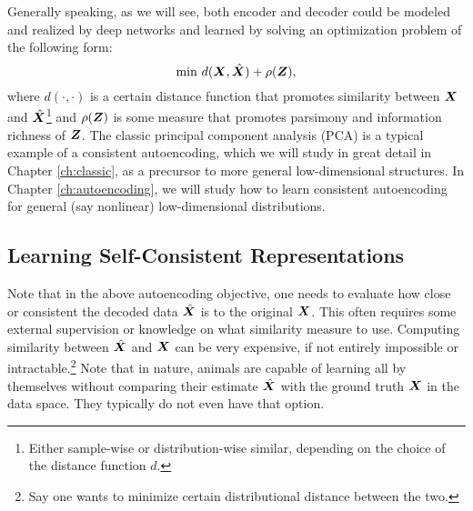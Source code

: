\documentclass[../../book-main.tex]{subfiles}
\begin{document}
Generally speaking, as we will see, both encoder and decoder could be modeled and realized by deep networks and learned by solving an optimization problem of the following form:
\begin{equation}
   \min \, d( \bm{X}, \hat {\bm{X}}) + \rho(\bm{Z}), 
   \label{eqn:auto-encoding-objective}
\end{equation}
where $d(\cdot, \cdot)$ is a certain distance function that promotes similarity between $\bm{X}$ and $\hat {\bm{X}}$\footnote{Either sample-wise or distribution-wise similar, depending on the choice of the distance function $d$.} and $\rho(\bm{Z})$ is some measure that promotes parsimony and information richness of $\bm{Z}$. The classic principal component analysis (PCA) \cite{JolliffeI2002} is a typical example of a consistent autoencoding, which we will study in great detail in Chapter \ref{ch:classic}, as a precursor to more general low-dimensional structures. In Chapter \ref{ch:autoencoding}, we will study how to learn consistent autoencoding for general (say nonlinear) low-dimensional distributions.  


\subsection{Learning Self-Consistent Representations}
Note that in the above autoencoding objective, one needs to evaluate how close or consistent the decoded data $\hat {\bm{X}}$ is to the original $\bm{X}$. This often requires some external supervision or knowledge on what similarity measure to use. Computing similarity between $\hat {\bm{X}}$ and $\bm{X}$ can be very expensive, if not entirely impossible or intractable.\footnote{Say one wants to minimize certain distributional distance between the two.} Note that in nature, animals are capable of learning all by themselves without comparing their estimate $\hat {\bm{X}}$ with the ground truth $\bm{X}$ in the data space. They typically do not even have that option. 
\end{document}
